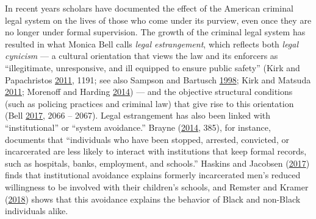 \documentclass[
  12pt,
]{article}
\begin{document}
In recent years scholars have documented the effect of the American criminal legal system on the lives of those who come under its purview, even once they are no longer under formal supervision. The growth of the criminal legal system has resulted in what Monica Bell calls \emph{legal estrangement}, which reflects both \emph{legal cynicism} --- a cultural orientation that views the law and its enforcers as ``illegitimate, unresponsive, and ill equipped to ensure public safety'' (Kirk and Papachristos \protect\hyperlink{ref-Kirk2011a}{2011}, 1191; see also Sampson and Bartusch \protect\hyperlink{ref-Sampson1998}{1998}; Kirk and Matsuda \protect\hyperlink{ref-Kirk2011}{2011}; Morenoff and Harding \protect\hyperlink{ref-Morenoff2014}{2014}) --- and the objective structural conditions (such as policing practices and criminal law) that give rise to this orientation (Bell \protect\hyperlink{ref-Bell2017}{2017}, 2066 -- 2067). Legal estrangement has also been linked with ``institutional'' or ``system avoidance.'' Brayne (\protect\hyperlink{ref-Brayne2014}{2014}, 385), for instance, documents that ``individuals who have been stopped, arrested, convicted, or incarcerated are less likely to interact with institutions that keep formal records, such as hospitals, banks, employment, and schools.'' Haskins and Jacobsen (\protect\hyperlink{ref-Haskins2017}{2017}) finds that institutional avoidance explains formerly incarcerated men's reduced willingness to be involved with their children's schools, and Remster and Kramer (\protect\hyperlink{ref-Remster2018}{2018}) shows that this avoidance explains the behavior of Black and non-Black individuals alike.
\end{document}
